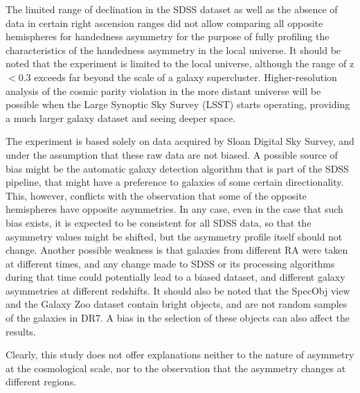 \documentclass[times,twocolumn]{article}
\begin{document}
The limited range of declination in the SDSS dataset as well as the absence of data in certain right ascension ranges did not allow comparing all opposite hemispheres for handedness asymmetry for the purpose of fully profiling the characteristics of the handedness asymmetry in the local universe. It should be noted that the experiment is limited to the local universe, although the range of z$<$0.3 exceeds far beyond the scale of a galaxy supercluster. Higher-resolution analysis of the cosmic parity violation in the more distant universe will be possible when the Large Synoptic Sky Survey (LSST) starts operating, providing a much larger galaxy dataset and seeing deeper space.

The experiment is based solely on data acquired by Sloan Digital Sky Survey, and under the assumption that these raw data are not biased. A possible source of bias might be the automatic galaxy detection algorithm that is part of the SDSS pipeline, that might have a preference to galaxies of some certain directionality. This, however, conflicts with the observation that some of the opposite hemispheres have opposite asymmetries. In any case, even in the case that such bias exists, it is expected to be consistent for all SDSS data, so that the asymmetry values might be shifted, but the asymmetry profile itself should not change. Another possible weakness is that galaxies from different RA were taken at different times, and any change made to SDSS or its processing algorithms during that time could potentially lead to a biased dataset, and different galaxy asymmetries at different redshifts. It should also be noted that the SpecObj view and the Galaxy Zoo dataset contain bright objects, and are not random samples of the galaxies in DR7. A bias in the selection of these objects can also affect the results. 

Clearly, this study does not offer explanations neither to the nature of asymmetry at the cosmological scale, nor to the observation that the asymmetry changes at different regions. %
\end{document}
